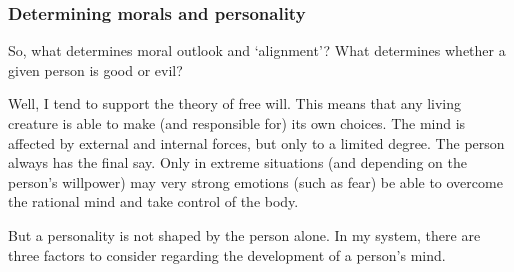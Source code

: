 \subsubsection{Determining morals and personality}
So, what determines moral outlook and `alignment'? What determines whether a given person is good or evil? 

Well, I tend to support the theory of free will. This means that any living creature is able to make (and responsible for) its own choices. The mind is affected by external and internal forces, but only to a limited degree. The person always has the final say. Only in extreme situations (and depending on the person's willpower) may very strong emotions (such as fear) be able to overcome the rational mind and take control of the body. 



\begin{comment}
This section will be heavily opinionated and influenced by my own view of moral philosophy. If you, as a GM, have a different world view, you may discount my rantings here. But this is the world view on which I have based my world. 

A basic concept is the axiom of free will: Any living creature has a free will. The mind is non-deterministic. The choices that a creature makes are not (entirely) controlled by outside forces and cannot be predicted (with certainty). 

The mind is affected by external and internal forces, however. The mind is subject to causality, but not entirely. Such causal forces affect the statistical likelihood that a certain person, in a certain situation, will do a certain thing, but only statistically. The individual person always retains his free will to choose between alternatives. 

So, what does all this have to do with anything? Well, it has to do with how a personality is formed, and how a person becomes good or evil. 

In my world, the forming of a person's personality is determined by three factors: Genetic, social and personal. 
\end{comment}




But a personality is not shaped by the person alone. In my system, there are three factors to consider regarding the development of a person's mind. 



